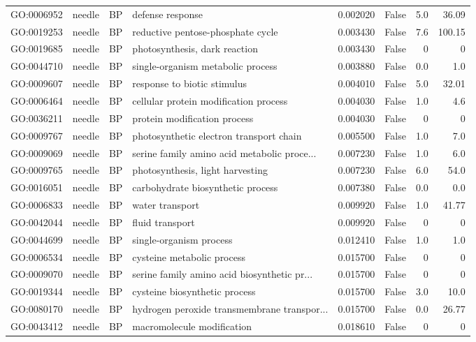 \begin{longtable}{llllrlrr}
GO:0006952 & needle & BP &   defense response  & 0.002020 &   False  & 5.0 & 36.09 \\ 
GO:0019253 & needle & BP &   reductive pentose-phosphate cycle  & 0.003430 &   False  & 7.6 & 100.15 \\ 
GO:0019685 & needle & BP &   photosynthesis, dark reaction  & 0.003430 &   False  & 0 & 0 \\
GO:0044710 & needle & BP &   single-organism metabolic process  & 0.003880 &   False  & 0.0 & 1.0 \\ 
GO:0009607 & needle & BP &   response to biotic stimulus  & 0.004010 &   False  & 5.0 & 32.01 \\ 
GO:0006464 & needle & BP &   cellular protein modification process  & 0.004030 &   False  & 1.0 & 4.6 \\ 
GO:0036211 & needle & BP &   protein modification process  & 0.004030 &   False  & 0 & 0 \\
GO:0009767 & needle & BP &   photosynthetic electron transport chain  & 0.005500 &   False  & 1.0 & 7.0 \\ 
GO:0009069 & needle & BP &   serine family amino acid metabolic proce...  & 0.007230 &   False  & 1.0 & 6.0 \\ 
GO:0009765 & needle & BP &   photosynthesis, light harvesting  & 0.007230 &   False  & 6.0 & 54.0 \\ 
GO:0016051 & needle & BP &   carbohydrate biosynthetic process  & 0.007380 &   False  & 0.0 & 0.0 \\ 
GO:0006833 & needle & BP &   water transport  & 0.009920 &   False  & 1.0 & 41.77 \\ 
GO:0042044 & needle & BP &   fluid transport  & 0.009920 &   False  & 0 & 0 \\
GO:0044699 & needle & BP &   single-organism process  & 0.012410 &   False  & 1.0 & 1.0 \\ 
GO:0006534 & needle & BP &   cysteine metabolic process  & 0.015700 &   False  & 0 & 0 \\
GO:0009070 & needle & BP &   serine family amino acid biosynthetic pr...  & 0.015700 &   False  & 0 & 0 \\
GO:0019344 & needle & BP &   cysteine biosynthetic process  & 0.015700 &   False  & 3.0 & 10.0 \\ 
GO:0080170 & needle & BP &   hydrogen peroxide transmembrane transpor...  & 0.015700 &   False  & 0.0 & 26.77 \\ 
GO:0043412 & needle & BP &   macromolecule modification  & 0.018610 &   False  & 0 & 0 \\

\end{longtable}
